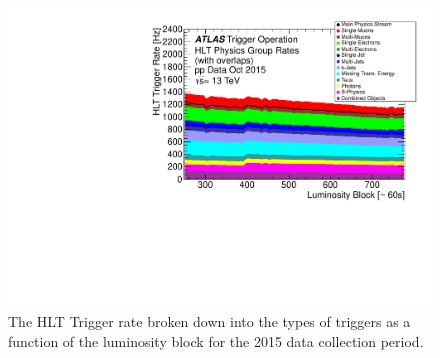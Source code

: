 \begin{figure}[hbtp]
\includegraphics[width=\fullfig]{figures/trigger_hltrate.pdf}
\caption{The HLT Trigger rate broken down into the types of triggers as a function of the luminosity block for the 2015 data collection period.}
\label{fig:trigger_hltrate}
\end{figure}

